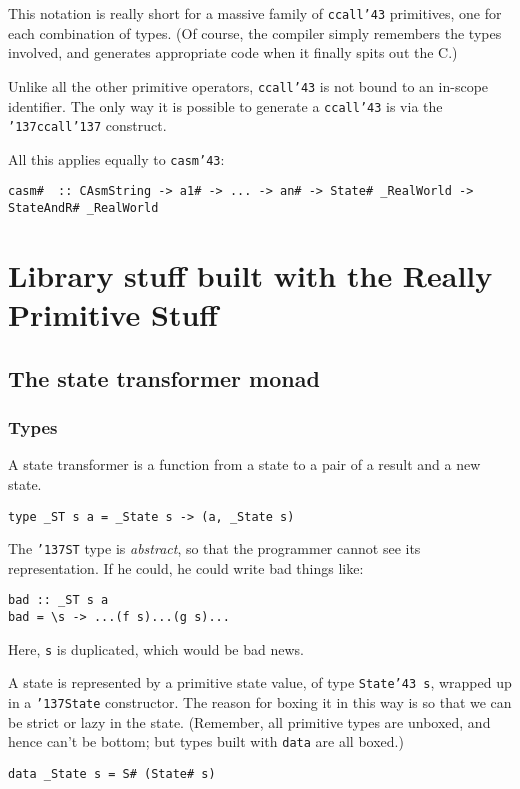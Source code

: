 This notation is really short for a massive family of \mbox{\tt ccall{\char'43}} primitives, one 
for each combination of types.  (Of course, the compiler simply remembers the 
types involved, and generates appropriate code when it finally spits out the C.)

Unlike all the other primitive operators, \mbox{\tt ccall{\char'43}} is not bound to an in-scope 
identifier.  The only way it is possible to generate a \mbox{\tt ccall{\char'43}} is via the 
\mbox{\tt {\char'137}ccall{\char'137}} construct.

All this applies equally to \mbox{\tt casm{\char'43}}:
\begin{verbatim}
casm#  :: CAsmString -> a1# -> ... -> an# -> State# _RealWorld -> StateAndR# _RealWorld
\end{verbatim}

\section{Library stuff built with the Really Primitive Stuff}

\subsection{The state transformer monad}

\subsubsection{Types}

A state transformer is a function from a state to a pair of a result and a new 
state.  
\begin{verbatim}
type _ST s a = _State s -> (a, _State s)
\end{verbatim}
The \mbox{\tt {\char'137}ST} type is {\em abstract}, so that the programmer cannot see its 
representation.  If he could, he could write bad things like:
\begin{verbatim}
bad :: _ST s a
bad = \s -> ...(f s)...(g s)...
\end{verbatim}
Here, \mbox{\tt s} is duplicated, which would be bad news.

A state is represented by a primitive state value, of type \mbox{\tt State{\char'43}\ s}, 
wrapped up in a \mbox{\tt {\char'137}State} constructor.  The reason for boxing it in this
way is so that we can be strict or lazy in the state.  (Remember, all 
primitive types are unboxed, and hence can't be bottom; but types built
with \mbox{\tt data} are all boxed.)
\begin{verbatim}
data _State s = S# (State# s)
\end{verbatim}

